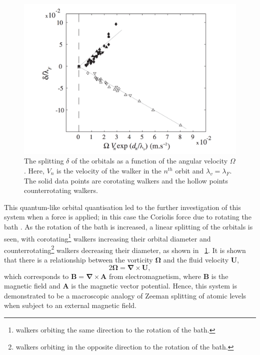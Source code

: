 \documentclass[11pt,twocolumn]{article}
\newcommand{\figref}[2][\figurename~]{#1\ref{#2}}
\begin{document}
\begin{figure}[h]
    \centering
    \includegraphics[width=\columnwidth]{LevelSplitting.pdf}
    \caption{The splitting $\delta$ of the orbitals as a function of the angular velocity $\Omega$.  Here, $V_n$ is the velocity of the walker in the $n^{th}$ orbit and $\lambda_v=\lambda_F$.  The solid data points are corotating walkers and the hollow points counterrotating walkers.}
    \label{fig:levelsplitting}
\end{figure}

This quantum-like orbital quantisation led to the further investigation of this system when a force is applied; in this case the Coriolis force due to rotating the bath \cite{6}.  As the rotation of the bath is increased, a linear splitting of the orbitals is seen, with corotating\footnote{walkers orbiting the same direction to the rotation of the bath.} walkers increasing their orbital diameter and counterrotating\footnote{walkers orbiting in the opposite direction to the rotation of the bath.} walkers decreasing their diameter, as shown in \figref{fig:levelsplitting}.  It is shown that there is a relationship between the vorticity $\bm{\Omega}$ and the fluid velocity $\bm{U}$,
\begin{equation}
    \label{vorticity}
    2\bm{\Omega}=\bm{\nabla}\times\bm{U},
\end{equation}
which corresponds to $\bm{B}=\bm{\nabla}\times\bm{A}$ from electromagnetism, where $\bm{B}$ is the magnetic field and $\bm{A}$ is the magnetic vector potential.  Hence, this system is demonstrated to be a macroscopic analogy of Zeeman splitting of atomic levels when subject to an external magnetic field.
\end{document}
